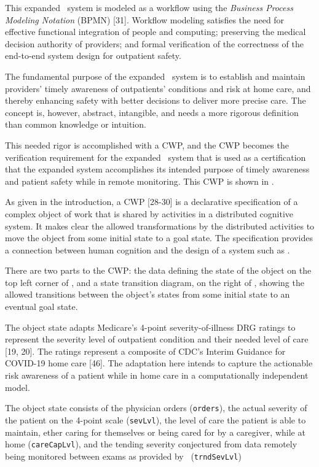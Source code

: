 This expanded \phware\ system is modeled as a workflow using the \emph{Business Process Modeling Notation} (BPMN) [31]. Workflow modeling satisfies the need for effective functional integration of people and computing; preserving the medical decision authority of providers; and formal verification of the correctness of the end-to-end system design for outpatient safety.

The fundamental purpose of the expanded \phware\ system is to establish and maintain providers' timely awareness of outpatients' conditions and risk at home care, and thereby enhancing safety with better decisions to deliver more precise care. The concept is, however, abstract, intangible, and needs a more rigorous definition than common knowledge or intuition. 

This needed rigor is accomplished with a CWP, and the CWP becomes the verification requirement for the expanded \phware\ system that is used as a certification that the expanded system accomplishes its intended purpose of timely awareness and patient safety while in remote monitoring. This CWP is shown in . 

As given in the introduction, a CWP [28-30] is a declarative specification of a complex object of work that is shared by activities in a distributed cognitive system. It makes clear the allowed transformations by the distributed activities to move the object from some initial state to a goal state. The specification provides a connection between human cognition and the design of a system such as \phware.

There are two parts to the CWP: the data defining the state of the object on the top left corner of , and a state transition diagram, on the right of , showing the allowed transitions between the object's states from some initial state to an eventual goal state. 

The object state adapts Medicare’s 4-point severity-of-illness DRG ratings to represent the severity level of outpatient condition and their needed level of care [19, 20]. The ratings represent a composite of CDC’s Interim Guidance for COVID-19 home care [46]. The adaptation here intends to capture the actionable risk awareness of a patient while in home care in a computationally independent model. 

The object state consists of the physician orders (\texttt{orders}), the actual severity of the patient on the 4-point scale (\texttt{sevLvl}), the level of care the patient is able to maintain, ether caring for themselves or being cared for by a caregiver, while at home (\texttt{careCapLvl}), and the tending severity conjectured from data remotely being monitored between exams as provided by \phware\ (\texttt{trndSevLvl})


